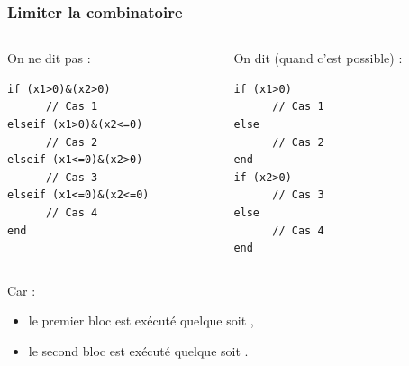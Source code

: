 \documentclass{beamer}
\begin{document}
\begin{frame}[containsverbatim]
\frametitle{Limiter la combinatoire}

\begin{example}
\begin{columns}[t]

    \begin{column}[t]{0.45\textwidth}
	
On ne dit pas :
\begin{lstlisting}
if (x1>0)&(x2>0) 
      // Cas 1
elseif (x1>0)&(x2<=0) 
      // Cas 2
elseif (x1<=0)&(x2>0) 
      // Cas 3
elseif (x1<=0)&(x2<=0) 
      // Cas 4
end
\end{lstlisting}

    \end{column}
	
    \begin{column}[t]{0.45\textwidth}

On dit (quand c'est possible) :
\begin{lstlisting}
if (x1>0) 
      // Cas 1
else
      // Cas 2
end
if (x2>0) 
      // Cas 3
else
      // Cas 4
end
\end{lstlisting}
    \end{column}
\end{columns}
Car : 
\begin{itemize}
\item le premier bloc  est exécuté quelque soit ,
\item le second bloc  est exécuté quelque soit .
\end{itemize}
\end{example}

\end{frame}
\end{document}
